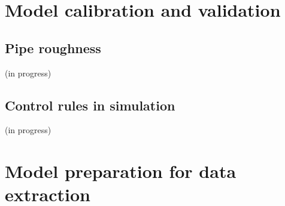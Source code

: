 \section{Model calibration and validation}
\label{model_calibration_and_validation}

\subsection{Pipe roughness}
\label{pipe_roughness}

(in progress)

\subsection{Control rules in simulation}
\label{control rules in simulation}

(in progress)

\section{Model preparation for data extraction}
\label{model_preparation_for_data_extraction}

























